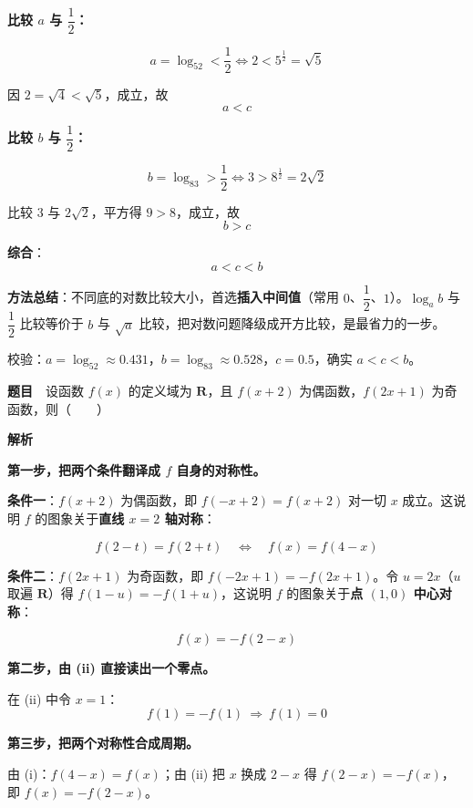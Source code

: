 \textbf{比较 $a$ 与 $\dfrac12$：}

\[a=\log_52<\frac12\iff 2<5^{\frac12}=\sqrt5\]

因 $2=\sqrt4<\sqrt5$，成立，故
\[a<c\]

\par\medskip

\textbf{比较 $b$ 与 $\dfrac12$：}

\[b=\log_83>\frac12\iff 3>8^{\frac12}=2\sqrt2\]

比较 $3$ 与 $2\sqrt2$，平方得 $9>8$，成立，故
\[b>c\]

\par\medskip

\textbf{综合}：
\[a<c<b\]


\begin{gktip}
\textbf{方法总结}：不同底的对数比较大小，首选\textbf{插入中间值}（常用 $0$、$\dfrac12$、$1$）。$\log_ab$ 与 $\dfrac12$ 比较等价于 $b$ 与 $\sqrt a$ 比较，把对数问题降级成开方比较，是最省力的一步。

校验：$a=\log_52\approx0.431$，$b=\log_83\approx0.528$，$c=0.5$，确实 $a<c<b$。
\end{gktip}

\par\medskip


\textbf{题目}　设函数 $f(x)$ 的定义域为 $\mathbf R$，且 $f(x+2)$ 为偶函数，$f(2x+1)$ 为奇函数，则（　　）

\textbf{解析}

\textbf{第一步，把两个条件翻译成 $f$ 自身的对称性。}

\textbf{条件一}：$f(x+2)$ 为偶函数，即 $f(-x+2)=f(x+2)$ 对一切 $x$ 成立。这说明 $f$ 的图象关于\textbf{直线 $x=2$ 轴对称}：

\[f(2-t)=f(2+t)\quad\Longleftrightarrow\quad f(x)=f(4-x)\tag{i}\]

\textbf{条件二}：$f(2x+1)$ 为奇函数，即 $f(-2x+1)=-f(2x+1)$。令 $u=2x$（$u$ 取遍 $\mathbf R$）得 $f(1-u)=-f(1+u)$，这说明 $f$ 的图象关于\textbf{点 $(1,0)$ 中心对称}：

\[f(x)=-f(2-x)\tag{ii}\]

\textbf{第二步，由 (ii) 直接读出一个零点。}

在 (ii) 中令 $x=1$：
\[f(1)=-f(1)\ \Longrightarrow\ f(1)=0\]

\textbf{第三步，把两个对称性合成周期。}

由 (i)：$f(4-x)=f(x)$；由 (ii) 把 $x$ 换成 $2-x$ 得 $f(2-x)=-f(x)$，即 $f(x)=-f(2-x)$。

